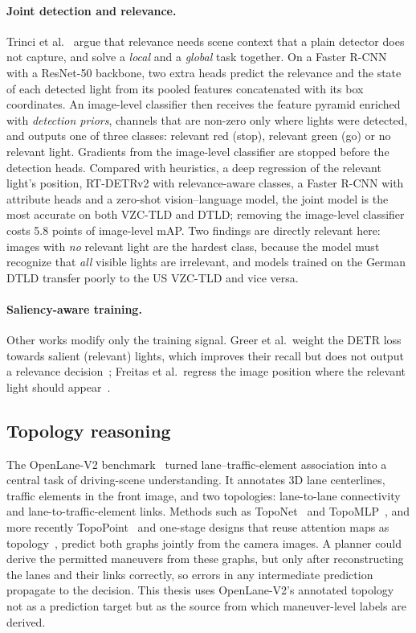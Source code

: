 \paragraph{Joint detection and relevance.} Trinci et al.~\cite{trinci2026color} argue that relevance
needs scene context that a plain detector does not capture, and solve a \emph{local} and a
\emph{global} task together. On a Faster R-CNN~\cite{ren2015faster} with a ResNet-50 backbone, two
extra heads predict the relevance and the state of each detected light from its pooled features
concatenated with its box coordinates. An image-level classifier then receives the feature pyramid
enriched with \emph{detection priors}, channels that are non-zero only where lights were detected, and
outputs one of three classes: relevant red (stop), relevant green (go) or no relevant light. Gradients
from the image-level classifier are stopped before the detection heads. Compared with heuristics, a
deep regression of the relevant light's position, RT-DETRv2 with relevance-aware classes, a Faster
R-CNN with attribute heads and a zero-shot vision--language model, the joint model is the most
accurate on both VZC-TLD and DTLD; removing the image-level classifier costs 5.8 points of image-level
mAP. Two findings are directly relevant here: images with \emph{no} relevant light are the hardest
class, because the model must recognize that \emph{all} visible lights are irrelevant, and models trained
on the German DTLD transfer poorly to the US VZC-TLD and vice versa.

\paragraph{Saliency-aware training.} Other works modify only the training signal. Greer et al.\ weight
the DETR loss towards salient (relevant) lights, which improves their recall but does not output a
relevance decision~\cite{greer2023salience}; Freitas et al.\ regress the image position where the
relevant light should appear~\cite{freitas2019relevant}.

\subsection{Topology reasoning}

The OpenLane-V2 benchmark~\cite{wang2023openlanev2} turned lane--traffic-element association into a
central task of driving-scene understanding. It annotates 3D lane centerlines, traffic elements in the
front image, and two topologies: lane-to-lane connectivity and lane-to-traffic-element links. Methods
such as TopoNet~\cite{li2023graph} and TopoMLP~\cite{wu2024topomlp}, and more recently
TopoPoint~\cite{fu2026topopoint} and one-stage designs that reuse attention maps as
topology~\cite{li2025reusing}, predict both graphs jointly from the camera images. A planner could
derive the permitted maneuvers from these graphs, but only after reconstructing the lanes and their
links correctly, so errors in any intermediate prediction propagate to the decision. This thesis uses
OpenLane-V2's annotated topology not as a prediction target but as the source from which maneuver-level
labels are derived.

